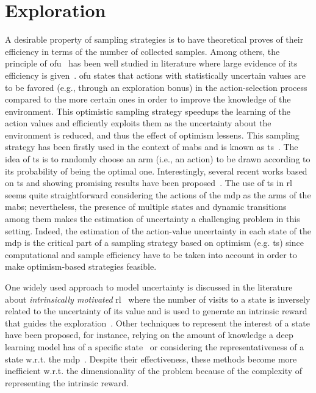\chapter{Exploration}
A desirable property of sampling strategies is to have theoretical proves of their efficiency in terms of the number of collected samples. Among others, the principle of \gls{ofu}~\cite{lai1985asymptotically} has been well studied in literature where large evidence of its efficiency is given~\cite{jaksch2010near, kakade2003sample, kearns2002near}. \gls{ofu} states that actions with statistically uncertain values are to be favored (e.g., through an exploration bonus) in the action-selection process compared to the more certain ones in order to improve the knowledge of the environment. This optimistic sampling strategy speedups the learning of the action values and efficiently exploits them as the uncertainty about the environment is reduced, and thus the effect of optimism lessens. This sampling strategy has been firstly used in the context of \glspl{mab} and is known as \gls{ts}~\cite{thompson1933likelihood}. The idea of \gls{ts} is to randomly choose an arm (i.e., an action) to be drawn according to its probability of being the optimal one. Interestingly, several recent works based on \gls{ts} and showing promising results have been proposed~\cite{chapelle2011empirical, granmo2010solving, may2011simulation, scott2010modern}. The use of \gls{ts} in \gls{rl} seems quite straightforward considering the actions of the \gls{mdp} as the arms of the \glspl{mab}; nevertheless, the presence of multiple states and dynamic transitions among them makes the estimation of uncertainty a challenging problem in this setting. Indeed, the estimation of the action-value uncertainty in each state of the \gls{mdp} is the critical part of a sampling strategy based on optimism (e.g. \gls{ts}) since computational and sample efficiency have to be taken into account in order to make optimism-based strategies feasible.

One widely used approach to model uncertainty is discussed in the literature about \textit{intrinsically motivated} \gls{rl}~\cite{chentanez2005intrinsically, schmidhuber1991possibility} where the number of visits to a state is inversely related to the uncertainty of its value and is used to generate an intrinsic reward that guides the exploration~\cite{bellemare2016unifying, tang2017exploration}. Other techniques to represent the interest of a state have been proposed, for instance, relying on the amount of knowledge a deep learning model has of a specific state~\cite{pathak2017curiosity} or considering the representativeness of a state w.r.t. the \gls{mdp}~\cite{bonarini2006self}. Despite their effectiveness, these methods become more inefficient w.r.t. the dimensionality of the problem because of the complexity of representing the intrinsic reward.

